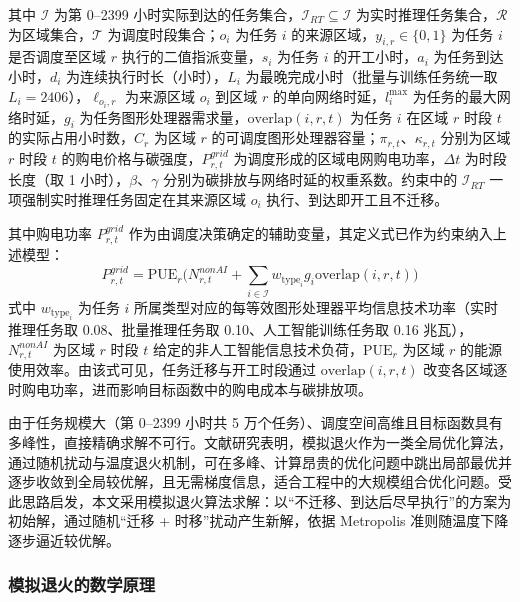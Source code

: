 \documentclass{ctexart}
\begin{document}
其中 $\mathcal{I}$ 为第 0–2399 小时实际到达的任务集合，$\mathcal{I}_{RT}\subseteq\mathcal{I}$ 为实时推理任务集合，$\mathcal{R}$ 为区域集合，$\mathcal{T}$ 为调度时段集合；$o_i$ 为任务 $i$ 的来源区域，$y_{i,r}\in\{0,1\}$ 为任务 $i$ 是否调度至区域 $r$ 执行的二值指派变量，$s_i$ 为任务 $i$ 的开工小时，$a_i$ 为任务到达小时，$d_i$ 为连续执行时长（小时），$L_i$ 为最晚完成小时（批量与训练任务统一取 $L_i=2406$），$\ell_{o_i,r}$ 为来源区域 $o_i$ 到区域 $r$ 的单向网络时延，$l_i^{\max}$ 为任务的最大网络时延，$g_i$ 为任务图形处理器需求量，$\mathrm{overlap}(i,r,t)$ 为任务 $i$ 在区域 $r$ 时段 $t$ 的实际占用小时数，$C_r$ 为区域 $r$ 的可调度图形处理器容量；$\pi_{r,t}$、$\kappa_{r,t}$ 分别为区域 $r$ 时段 $t$ 的购电价格与碳强度，$P^{grid}_{r,t}$ 为调度形成的区域电网购电功率，$\Delta t$ 为时段长度（取 1 小时），$\beta$、$\gamma$ 分别为碳排放与网络时延的权重系数。约束中的 $\mathcal{I}_{RT}$ 一项强制实时推理任务固定在其来源区域 $o_i$ 执行、到达即开工且不迁移。

其中购电功率 $P^{grid}_{r,t}$ 作为由调度决策确定的辅助变量，其定义式已作为约束纳入上述模型：
\[
P^{grid}_{r,t}=\mathrm{PUE}_r\big(N^{nonAI}_{r,t}+\sum_{i\in\mathcal{I}}w_{\mathrm{type}_i}g_i\mathrm{overlap}(i,r,t)\big)
\]
式中 $w_{\mathrm{type}_i}$ 为任务 $i$ 所属类型对应的每等效图形处理器平均信息技术功率（实时推理任务取 0.08、批量推理任务取 0.10、人工智能训练任务取 0.16 兆瓦），$N^{nonAI}_{r,t}$ 为区域 $r$ 时段 $t$ 给定的非人工智能信息技术负荷，$\mathrm{PUE}_r$ 为区域 $r$ 的能源使用效率。由该式可见，任务迁移与开工时段通过 $\mathrm{overlap}(i,r,t)$ 改变各区域逐时购电功率，进而影响目标函数中的购电成本与碳排放项。

由于任务规模大（第 0–2399 小时共 5 万个任务）、调度空间高维且目标函数具有多峰性，直接精确求解不可行。文献研究表明，模拟退火作为一类全局优化算法，通过随机扰动与温度退火机制，可在多峰、计算昂贵的优化问题中跳出局部最优并逐步收敛到全局较优解，且无需梯度信息，适合工程中的大规模组合优化问题\cite{joseph2024}。受此思路启发，本文采用模拟退火算法求解：以“不迁移、到达后尽早执行”的方案为初始解，通过随机“迁移 + 时移”扰动产生新解，依据 Metropolis 准则随温度下降逐步逼近较优解。

\subsubsection{模拟退火的数学原理}
\end{document}
